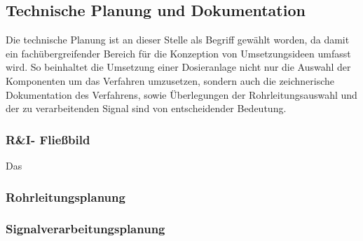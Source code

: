 \subsection{Technische Planung und Dokumentation}
Die technische Planung ist an dieser Stelle als Begriff gewählt worden, da damit ein fachübergreifender Bereich für die Konzeption von Umsetzungsideen umfasst wird. So beinhaltet die Umsetzung einer Dosieranlage nicht nur die Auswahl der Komponenten um das Verfahren umzusetzen, sondern auch die zeichnerische Dokumentation des Verfahrens, sowie Überlegungen der Rohrleitungsauswahl und der zu verarbeitenden Signal sind von entscheidender Bedeutung. 

\subsubsection{R\&I- Fließbild}
Das 

\subsubsection{Rohrleitungsplanung}


\subsubsection{Signalverarbeitungsplanung}


%
%
%
%
%
